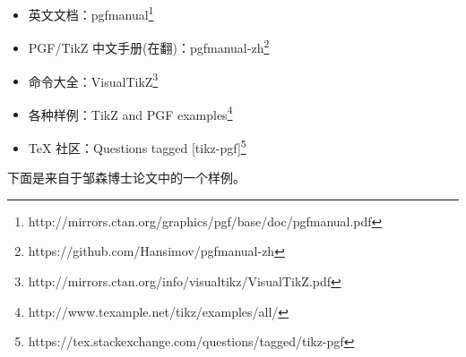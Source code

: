 \begin{itemize}
    \item 英文文档：pgfmanual\footnote{http://mirrors.ctan.org/graphics/pgf/base/doc/pgfmanual.pdf}
    \item PGF/TikZ 中文手册(在翻)：pgfmanual-zh\footnote{https://github.com/Hansimov/pgfmanual-zh}
    \item 命令大全：VisualTikZ\footnote{http://mirrors.ctan.org/info/visualtikz/VisualTikZ.pdf}
     \item 各种样例：TikZ and PGF examples\footnote{http://www.texample.net/tikz/examples/all/}
     \item TeX 社区：Questions tagged [tikz-pgf]\footnote{https://tex.stackexchange.com/questions/tagged/tikz-pgf}
\end{itemize}

下面是来自于邹森博士论文中的一个样例。
